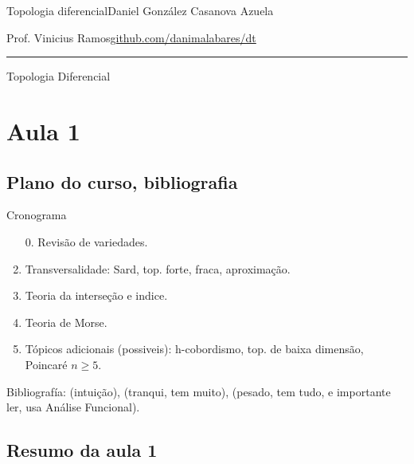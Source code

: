 
\newcommand{\rightlooparrow}{\mathbin{
    \vbox{\openup-10.25pt\halign{\hss$##$\hss\cr\circ\cr\longrightarrow\cr}}
}}




\begin{minipage}{\textwidth}
	\begin{minipage}{1\textwidth}
		Topologia diferencial\hfill Daniel González Casanova Azuela
		
		{\small Prof. Vinicius Ramos\hfill\href{https://github.com/danimalabares/k3}{github.com/danimalabares/dt}}
	\end{minipage}
\end{minipage}\vspace{.2cm}\hrule

\vspace{10pt}
{\huge Topologia Diferencial}
\tableofcontents
\section{Aula 1}

\subsection{Plano do curso, bibliografia}

Cronograma
\begin{enumerate}
	\item[0.] Revisão de variedades.
	\item Transversalidade: Sard, top. forte, fraca, aproximação.
	\item  Teoria da interseção e indice.
	\item Teoria de Morse.
	\item Tópicos adicionais (possiveis): h-cobordismo, top. de baixa dimensão, Poincaré \(n\geq 5\).
\end{enumerate}

Bibliografía: \cite{milnordt} (intuição),  \cite{gui} (tranqui, tem muito), \cite{hirsch} (pesado, tem tudo, e importante ler, usa Análise Funcional). 

\subsection{Resumo da aula 1}

